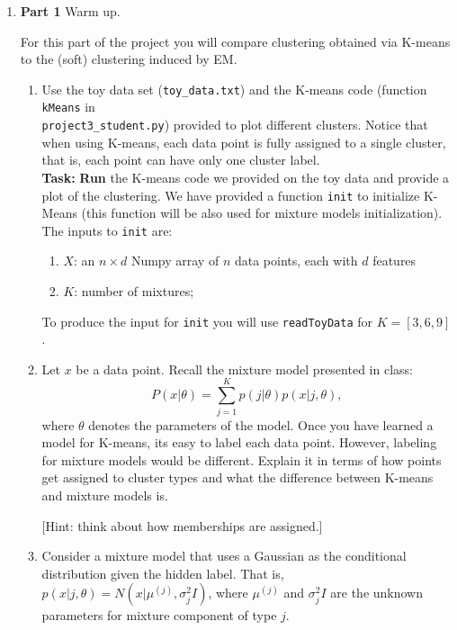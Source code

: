 \begin{enumerate}

\item {\bf Part 1} Warm up.

For this part of the project you will compare clustering obtained via K-means to the (soft) clustering induced by EM.

\begin{enumerate}
  \item Use the toy data set (\texttt{toy\_data.txt}) and the K-means code (function \texttt{kMeans} in\\ \texttt{project3\_student.py}) provided to plot different clusters. Notice that when using K-means, each data point is fully assigned to a single cluster, that is, each point can have only one cluster label.\\
  \textbf{Task:} \textbf{Run} the K-means code we provided on the toy data and provide a plot of the clustering. We have provided a function \texttt{init} to initialize  K-Means (this function will be also used for mixture models initialization). The inputs to \texttt{init} are:
  \begin{enumerate}
  \item $X$: an $n \times d$ Numpy array of $n$ data points, each with $d$ features
  \item $K$: number of mixtures;
  \end{enumerate}
  To produce the input for \texttt{init} you will use \texttt{readToyData} for $K= [3, 6, 9]$. 

  \item Let $x$ be a data point. Recall the mixture model presented in class:
  $$P(x | \theta) = \sum^{K}_{j=1} p(j| \theta)p(x | j, \theta),$$ 
  where $\theta$ denotes the parameters of the model. Once you have learned a model for K-means, its easy to label each data point. However, labeling for mixture models would be different. Explain it in terms of how points get assigned to cluster types and what the difference between K-means and mixture models is. 
  
  [Hint: think about how memberships are assigned.]
  
 \item Consider a mixture model that uses a Gaussian as the conditional distribution given the hidden label. That is, $p(x | j, \theta) = N(x | \mu^{(j)}, \sigma^2_{j} I)$, where $\mu^{(j)}$ and $\sigma^2_jI$ are the unknown parameters for mixture component of type $j$.


\end{enumerate}
\end{enumerate}
